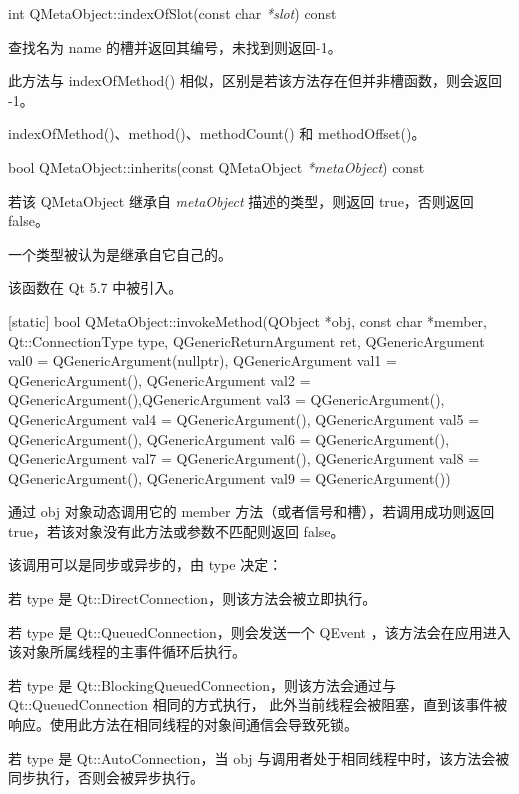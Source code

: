 int QMetaObject::indexOfSlot(const char \emph{*slot}) const

查找名为 name 的槽并返回其编号，未找到则返回-1。

此方法与 indexOfMethod() 相似，区别是若该方法存在但并非槽函数，则会返回 -1。

\begin{notice}[另请参阅]
indexOfMethod()、method()、methodCount() 和 methodOffset()。
\end{notice}


bool QMetaObject::inherits(const QMetaObject \emph{*metaObject}) const

若该 QMetaObject 继承自 \emph{metaObject} 描述的类型，则返回 true，否则返回 false。

一个类型被认为是继承自它自己的。

该函数在 Qt 5.7 中被引入。

[static] bool QMetaObject::invokeMethod(QObject *obj, const char *member, 
 Qt::ConnectionType type, QGenericReturnArgument ret, 
 QGenericArgument val0 = QGenericArgument(nullptr), QGenericArgument val1 = QGenericArgument(), 
 QGenericArgument val2 = QGenericArgument(),QGenericArgument val3 = QGenericArgument(), 
 QGenericArgument val4 = QGenericArgument(), QGenericArgument val5 = QGenericArgument(), 
 QGenericArgument val6 = QGenericArgument(), QGenericArgument val7 = QGenericArgument(), 
 QGenericArgument val8 = QGenericArgument(), QGenericArgument val9 = QGenericArgument())

通过 obj 对象动态调用它的 member 方法（或者信号和槽），若调用成功则返回 true，若该对象没有此方法或参数不匹配则返回 false。

该调用可以是同步或异步的，由 type 决定：

\begin{compactitem}
\item 若 type 是 Qt::DirectConnection，则该方法会被立即执行。
\item 若 type 是 Qt::QueuedConnection，则会发送一个 QEvent ，该方法会在应用进入该对象所属线程的主事件循环后执行。
\item 若 type 是 Qt::BlockingQueuedConnection，则该方法会通过与 Qt::QueuedConnection 相同的方式执行，
	此外当前线程会被阻塞，直到该事件被响应。使用此方法在相同线程的对象间通信会导致死锁。
\item 若 type 是 Qt::AutoConnection，当 obj 与调用者处于相同线程中时，该方法会被同步执行，否则会被异步执行。
\end{compactitem}